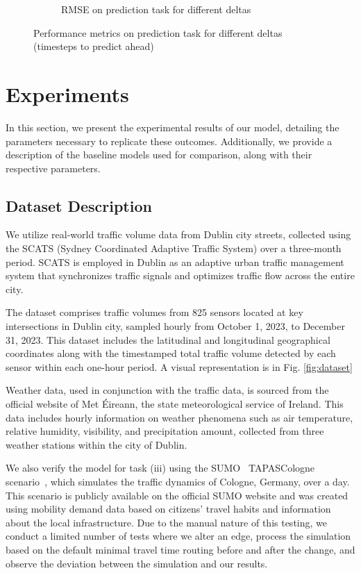 \begin{figure}[]
\begin{subfigure}[b]{0.4\textwidth}
      \caption{RMSE on prediction task for different deltas}
      \label{fig:rmse_pred}
  \end{subfigure}
  
  \caption{Performance metrics on prediction task for different deltas (timesteps to predict ahead)}
  \label{fig:pred_metrics}
\end{figure}
\section{Experiments}\label{sec:experiments}
In this section, we present the experimental results of our model, detailing the parameters necessary to replicate these outcomes. Additionally, we provide a description of the baseline models used for comparison, along with their respective parameters.

\subsection{Dataset Description}

We utilize real-world traffic volume data from Dublin city streets, collected using the SCATS (Sydney Coordinated Adaptive Traffic System) over a three-month period. SCATS is employed in Dublin as an adaptive urban traffic management system that synchronizes traffic signals and optimizes traffic flow across the entire city.

The dataset comprises traffic volumes from 825 sensors located at key intersections in Dublin city, sampled hourly from October 1, 2023, to December 31, 2023. This dataset includes the latitudinal and longitudinal geographical coordinates along with the timestamped total traffic volume detected by each sensor within each one-hour period. A visual representation is in Fig. \ref{fig:dataset}

Weather data, used in conjunction with the traffic data, is sourced from the official website of Met Éireann, the state meteorological service of Ireland. This data includes hourly information on weather phenomena such as air temperature, relative humidity, visibility, and precipitation amount, collected from three weather stations within the city of Dublin.

We also verify the model for task (iii) using the SUMO~\cite{sumo} TAPASCologne scenario~\cite{tapas}, which simulates the traffic dynamics of Cologne, Germany, over a day. This scenario is publicly available on the official SUMO website and was created using mobility demand data based on citizens' travel habits and information about the local infrastructure. Due to the manual nature of this testing, we conduct a limited number of tests where we alter an edge, process the simulation based on the default minimal travel time routing before and after the change, and observe the deviation between the simulation and our results.

